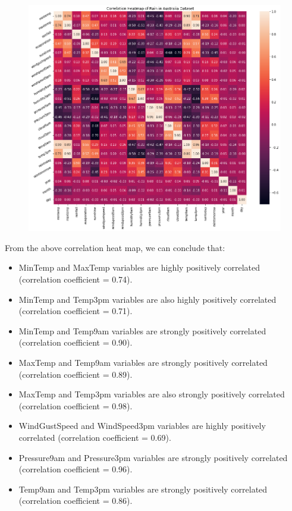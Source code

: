\documentclass{beamer}
\begin{document}
\begin{frame}[plain]
    \begin{figure}
        \includegraphics[width=.9\textwidth]{images/corr_heatmap.png}
    \end{figure}
\end{frame}

\begin{frame}[plain]
    From the above correlation heat map, we can conclude that:
    \small
    \begin{itemize}
        \item MinTemp and MaxTemp variables are highly positively correlated (correlation coefficient = 0.74).
        \item MinTemp and Temp3pm variables are also highly positively correlated (correlation coefficient = 0.71).
        \item MinTemp and Temp9am variables are strongly positively correlated (correlation coefficient = 0.90).
        \item MaxTemp and Temp9am variables are strongly positively correlated (correlation coefficient = 0.89).
        \item MaxTemp and Temp3pm variables are also strongly positively correlated (correlation coefficient = 0.98).
        \item WindGustSpeed and WindSpeed3pm variables are highly positively correlated (correlation coefficient = 0.69).
        \item Pressure9am and Pressure3pm variables are strongly positively correlated (correlation coefficient = 0.96).
        \item Temp9am and Temp3pm variables are strongly positively correlated (correlation coefficient = 0.86).
    \end{itemize}
\end{frame}
\end{document}
